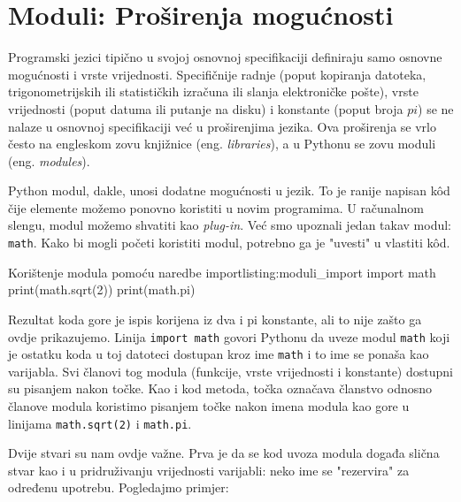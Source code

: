 \section{Moduli: Proširenja mogućnosti}\label{moduli}

Programski jezici tipično u svojoj osnovnoj specifikaciji definiraju samo osnovne mogućnosti i vrste vrijednosti. Specifičnije radnje (poput kopiranja datoteka, trigonometrijskih ili statističkih izračuna ili slanja elektroničke pošte), vrste vrijednosti (poput datuma ili putanje na disku) i konstante (poput broja $pi$) se ne nalaze u osnovnoj specifikaciji već u proširenjima jezika. Ova proširenja se vrlo često na engleskom zovu knjižnice (eng. \textit{libraries}), a u Pythonu se zovu moduli (eng. \textit{modules}).

Python modul, dakle, unosi dodatne mogućnosti u jezik. To je ranije napisan kôd čije elemente možemo ponovno koristiti u novim programima. U računalnom slengu, modul možemo shvatiti kao \textit{plug-in}. Već smo upoznali jedan takav modul: \texttt{math}. Kako bi mogli početi koristiti modul, potrebno ga je "uvesti" u vlastiti kôd.

\begin{python}{Korištenje modula pomoću naredbe import}{listing:moduli_import}
import math
print(math.sqrt(2))
print(math.pi)
\end{python}

Rezultat koda gore je ispis korijena iz dva i pi konstante, ali to nije zašto ga ovdje prikazujemo. Linija \texttt{import math} govori Pythonu da uveze modul \texttt{math} koji je ostatku koda u toj datoteci dostupan kroz ime \texttt{math} i to ime se ponaša kao varijabla. Svi članovi tog modula (funkcije, vrste vrijednosti i konstante) dostupni su pisanjem nakon točke. Kao i kod metoda, točka označava članstvo odnosno članove modula koristimo pisanjem točke nakon imena modula kao gore u linijama \texttt{math.sqrt(2)} i \texttt{math.pi}.

Dvije stvari su nam ovdje važne. Prva je da se kod uvoza modula događa slična stvar kao i u pridruživanju vrijednosti varijabli: neko ime se "rezervira" za određenu upotrebu. Pogledajmo primjer:


